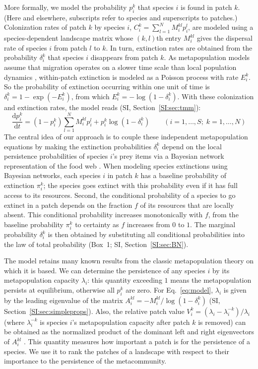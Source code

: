 \documentclass[11pt]{article}
\newcommand{\ud}{\text{d}}
\newcommand{\SI}{SI}
\begin{document}
More formally, we model the probability $p_i^k$ that species $i$ is found in patch $k$. (Here and elsewhere, subscripts refer to species and superscripts to patches.) Colonization rates of patch $k$ by species $i$, $C_i^k = \sum_{l=1}^N M_i^{kl} p_i^l$, are modeled using a species-dependent landscape matrix whose $(k,l)$th entry $M_i^{kl}$ gives the dispersal rate of species $i$ from patch $l$ to $k$. In turn, extinction rates are obtained from the probability $\delta_i^k$ that species $i$ disappears from patch $k$. As metapopulation models assume that migration operates on a slower time scale than local population dynamics \citep{Hanski1994}, within-patch extinction is modeled as a Poisson process with rate $E_i^k$. So the probability of extinction occurring within one unit of time is $\delta_i^k = 1 - \exp(-E_i^k)$, from which $E_i^k = -\log(1-\delta_i^k)$. With these colonization and extinction rates, the model reads (\SI, Section~\ref{SI:sec:tmm}):
\begin{equation}
  \label{eq:model}
  \frac{\ud p_i^k}{\ud t} = (1 - p_i^k) \sum_{l=1}^N M_i^{kl} p_i^l +
  p_i^k \log(1 - \delta_i^k) \qquad (i = 1, \ldots, S; \; k = 1, \ldots, N)
\end{equation}
The central idea of our approach is to couple these independent metapopulation equations by making the extinction probabilities $\delta_i^k$ depend on the local persistence probabilities of species $i$'s prey items via a Bayesian network representation of the food web \citep{Eklofetal2013MEE}. When modeling species extinctions using Bayesian networks, each species $i$ in patch $k$ has a baseline probability of extinction $\pi_i^k$; the species goes extinct with this probability even if it has full access to its resources. Second, the conditional probability of a species to go extinct in a patch depends on the fraction $f$ of its resources that are locally absent. This conditional probability increases monotonically with $f$, from the baseline probability $\pi_i^k$ to certainty as $f$ increases from $0$ to $1$. The marginal probability $\delta_i^k$ is then obtained by substituting all conditional probabilities into the law of total probability (Box~1; \SI, Section~\ref{SI:sec:BN}).

The model retains many known results from the classic metapopulation theory on which it is based. We can determine the persistence of any species $i$ by its metapopulation capacity $\lambda_i$: this quantity exceeding $1$ means the metapopulation persists at equilibrium, otherwise all $p_i^k$ are zero. For Eq.~\ref{eq:model}, $\lambda_i$ is given by the leading eigenvalue of the matrix $A_i^{kl} = -M_i^{kl} / \log(1 - \delta_i^k)$ (\SI, Section~\ref{SI:sec:simpleprops}). Also, the relative patch value $V_i^k = (\lambda_i - \lambda_i^{-k})/\lambda_i$ (where $\lambda_i^{-k}$ is species $i$'s metapopulation capacity after patch $k$ is removed) can be obtained as the normalized product of the dominant left and right eigenvectors of $A_i^{kl}$ \citep{OvaskainenHanski2001}. This quantity measures how important a patch is for the persistence of a species. We use it to rank the patches of a landscape with respect to their importance to the persistence of the metacommunity.
\end{document}
